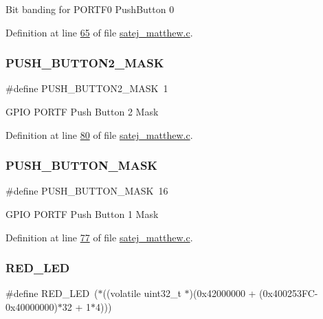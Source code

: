 Bit banding for P\+O\+R\+T\+F0 Push\+Button 0 

Definition at line \mbox{\hyperlink{satej__matthew_8c_source_l00065}{65}} of file \mbox{\hyperlink{satej__matthew_8c_source}{satej\+\_\+matthew.\+c}}.

\mbox{\label{satej__matthew_8c_a061bf1fc7521f6b5d85598f063e87c30}} 
\subsubsection{\texorpdfstring{PUSH\_BUTTON2\_MASK}{PUSH\_BUTTON2\_MASK}}
{\footnotesize\ttfamily \#define P\+U\+S\+H\+\_\+\+B\+U\+T\+T\+O\+N2\+\_\+\+M\+A\+SK~1}

G\+P\+IO P\+O\+R\+TF Push Button 2 Mask 

Definition at line \mbox{\hyperlink{satej__matthew_8c_source_l00080}{80}} of file \mbox{\hyperlink{satej__matthew_8c_source}{satej\+\_\+matthew.\+c}}.

\mbox{\label{satej__matthew_8c_aa39095336c165058ffd24cc58287f407}} 
\subsubsection{\texorpdfstring{PUSH\_BUTTON\_MASK}{PUSH\_BUTTON\_MASK}}
{\footnotesize\ttfamily \#define P\+U\+S\+H\+\_\+\+B\+U\+T\+T\+O\+N\+\_\+\+M\+A\+SK~16}

G\+P\+IO P\+O\+R\+TF Push Button 1 Mask 

Definition at line \mbox{\hyperlink{satej__matthew_8c_source_l00077}{77}} of file \mbox{\hyperlink{satej__matthew_8c_source}{satej\+\_\+matthew.\+c}}.

\mbox{\label{satej__matthew_8c_a073dbcb7f5bc4f4b45dc048b55eaff3d}} 
\subsubsection{\texorpdfstring{RED\_LED}{RED\_LED}}
{\footnotesize\ttfamily \#define R\+E\+D\+\_\+\+L\+ED~($\ast$((volatile uint32\+\_\+t $\ast$)(0x42000000 + (0x400253\+F\+C-\/0x40000000)$\ast$32 + 1$\ast$4)))}

